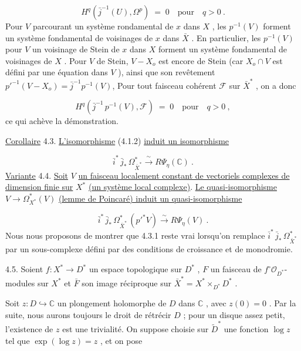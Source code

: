 \begin{equation*}
H^q(\bar{j}^{-1}(U), \Omega^p) \;=\; 0 \quad \text{pour} \quad q > 0 \ .
\end{equation*}
Pour $V$ parcourant un système rondamental de $x$ dans $X$ , les $p^{-1}(V)$ forment un système fondamental de voisinages de $x$ dans $\bar{X}$ . En particulier, les $p^{-1}(V)$ pour $V$ un voisinage de Stein de $x$ dans $X$ forment un système fondamental de voisinages de $X$ . Pour $V$ de Stein, $V-X_o$ est encore de Stein (car $X_o \cap V$ est défini par une équation dans $V$ ), ainsi que son revêtement $p'^{-1}(V-X_o) = \bar{j}^{-1}p^{-1}(V)$,
Pour tout faisceau cohérent $\mathcal{F}$ sur $\bar{X}^*$ , on a donc

\begin{equation*}
H^q(\bar{j}^{-1} \, p^{-1}(V), \mathcal{F}) \;=\; 0 \quad \text{pour} \quad q > 0 \ ,
\end{equation*}
ce qui achève la démonstration.

\underline{Corollaire} 4.3.  \underline{L'isomorphisme} (4.1.2) \underline{induit un isomorphisme}

\begin{equation}\tag{4.3.1}
\bar{i}^* \, \bar{j}_* \, \Omega^*_{\bar{X}^*} \xrightarrow{\;\sim\;} R\Psi_\eta(\mathbb{C}) \ .
\end{equation}
\underline{Variante} 4.4.  \underline{Soit} $V$ \underline{un faisceau localement constant de vectoriels complexes de dimension finie sur} $X^*$ \underline{(un système local complexe)}. \underline{Le quasi-isomorphisme} $V \longrightarrow \Omega^*_{X^*}(V)$ \underline{(lemme de Poincaré) induit un quasi-isomorphisme}

\begin{equation}\tag{4.4.1}
\bar{i}^* \, \bar{j}_* \, \Omega^*_{\bar{X}^*} \, (p'^* V) \xrightarrow{\;\sim\;} R\Psi_\eta(V) \ .
\end{equation}
Nous nous proposons de montrer que 4.3.1 reste vrai lorsqu'on remplace $\bar{i}^* \, \bar{j}_* \, \Omega^*_{\bar{X}^*}$ par un sous-complexe défini par des conditions de croissance et de monodromie.

4.5.  Soient $f : X^* \to D^*$ un espace topologique sur $D^*$ , $F$ un faisceau de $f^{\circ} \mathcal{O}_{D^*}$-modules sur $X^*$ et $\bar{F}$ son image réciproque sur $\bar{X}^* = X^* \times_{D^*} D^*$ .

Soit $z : D \hookrightarrow \mathbb{C}$ un plongement holomorphe de $D$ dans $\mathbb{C}$ , avec $z(0) = 0$ . Par la suite, nous aurons toujours le droit de rétrécir $D$ ; pour un disque assez petit, l'existence de $z$ est une trivialité. On suppose choisie sur $\tilde{D}^*$ une fonction $\log z$ tel que $\exp(\log z) = z$ , et on pose

